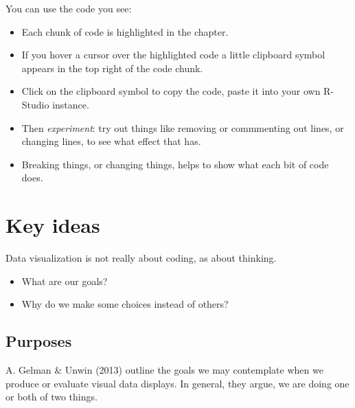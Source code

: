 \documentclass[
  letterpaper,
  DIV=11,
  numbers=noendperiod]{scrreprt}
\providecommand{\tightlist}{%
  \setlength{\itemsep}{0pt}\setlength{\parskip}{0pt}}\usepackage{longtable,booktabs,array}
\begin{document}
\begin{tcolorbox}[enhanced jigsaw, opacitybacktitle=0.6, title=\textcolor{quarto-callout-tip-color}{\faLightbulb}\hspace{0.5em}{Tip}, arc=.35mm, colbacktitle=quarto-callout-tip-color!10!white, colframe=quarto-callout-tip-color-frame, leftrule=.75mm, opacityback=0, breakable, titlerule=0mm, left=2mm, bottomrule=.15mm, toprule=.15mm, colback=white, coltitle=black, bottomtitle=1mm, toptitle=1mm, rightrule=.15mm]

You can use the code you see:

\begin{itemize}
\tightlist
\item
  Each chunk of code is highlighted in the chapter.
\item
  If you hover a cursor over the highlighted code a little clipboard
  symbol appears in the top right of the code chunk.
\item
  Click on the clipboard symbol to copy the code, paste it into your own
  R-Studio instance.
\item
  Then \emph{experiment}: try out things like removing or commmenting
  out lines, or changing lines, to see what effect that has.
\item
  Breaking things, or changing things, helps to show what each bit of
  code does.
\end{itemize}

\end{tcolorbox}

\hypertarget{sec-ideas}{%
\section{Key ideas}\label{sec-ideas}}

Data visualization is not really about coding, as about thinking.

\begin{itemize}
\tightlist
\item
  What are our goals?
\item
  Why do we make some choices instead of others?
\end{itemize}

\hypertarget{sec-purposes}{%
\subsection{Purposes}\label{sec-purposes}}

A. Gelman \& Unwin (2013) outline the goals we may contemplate when we
produce or evaluate visual data displays. In general, they argue, we are
doing one or both of two things.
\end{document}
